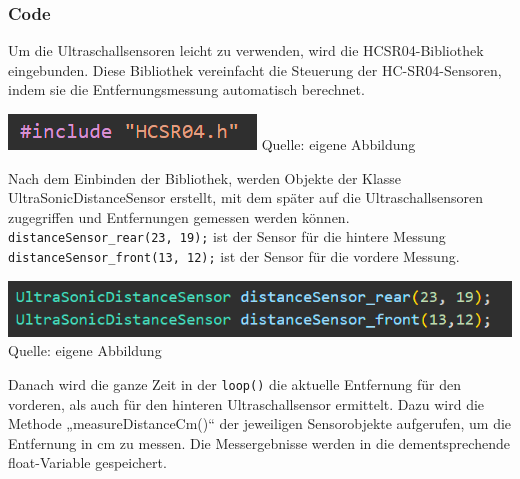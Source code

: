 \documentclass[ngerman,12pt,a4paper]{article}
\begin{document}
		\subsubsection{Code}
		Um die Ultraschallsensoren leicht zu verwenden, wird die HCSR04-Bibliothek eingebunden. Diese Bibliothek vereinfacht die Steuerung der HC-SR04-Sensoren, indem sie die Entfernungsmessung automatisch berechnet. 
		\begin{center}
			\begin{minipage}{0.5\textwidth}
				\centering
				\includegraphics[width=\textwidth]{Pictures/code_hcsr04_libary}
				\label{fig:code_hcsr04_libary}
				\vspace{5pt}
				{\small Quelle: {eigene Abbildung}}
			\end{minipage}
		\end{center}
		\vspace{8pt}
		Nach dem Einbinden der Bibliothek, werden Objekte der Klasse UltraSonicDistanceSensor erstellt, mit dem später auf die Ultraschallsensoren zugegriffen und Entfernungen gemessen werden können.\\[0.3cm] \texttt{distanceSensor\_rear(23, 19);} ist der Sensor für die hintere Messung\\ \texttt{distanceSensor\_front(13, 12);} ist der Sensor für die vordere Messung.
		\begin{center}
			\begin{minipage}{1\textwidth}
				\centering
				\includegraphics[width=\textwidth]{Pictures/code_hcsr04_objekte}
				\label{fig:code_hcsr04_objekte}
				\vspace{5pt}
				{\small Quelle: {eigene Abbildung}}
			\end{minipage}
		\end{center}
		\vspace{8pt}
		Danach wird die ganze Zeit in der \texttt{loop()} die aktuelle Entfernung für den vorderen, als auch für den hinteren Ultraschallsensor ermittelt. Dazu wird die Methode „measureDistanceCm()“ der jeweiligen Sensorobjekte aufgerufen, um die Entfernung in cm zu messen. Die Messergebnisse werden in die dementsprechende float-Variable gespeichert.
\end{document}
